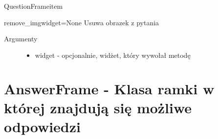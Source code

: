 \documentclass[letterpaper,10pt,polish]{manual}
\begin{document}
\begin{classdesc}{QuestionFrame}{item}
\hypertarget{QuestionFrame.QuestionFrame.remove\_img}{}\begin{methoddesc}{remove\_img}{widget=None}
Usuwa obrazek z pytania
\begin{description}
\item[Argumenty] \leavevmode\begin{itemize}
\item {} 
widget - opcjonalnie, widżet, który wywołał metodę

\end{itemize}

\end{description}
\end{methoddesc}
\end{classdesc}
\hypertarget{answerframe}{}

\chapter{AnswerFrame - Klasa ramki w której znajdują się możliwe odpowiedzi}
\hypertarget{module-AnswerFrame}{}
\modulesynopsis{}
\end{document}
